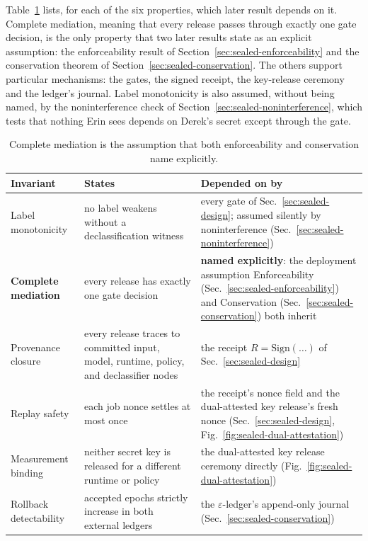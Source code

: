 \documentclass[11pt,a4paper]{article}
\theoremstyle{definition}
\begin{document}
Table~\ref{tab:sealed-side-invariants} lists, for each of the six
properties, which later result depends on it. Complete mediation, meaning that
every release passes through exactly one gate decision, is the only property
that two later results state as an explicit assumption: the enforceability
result of Section~\ref{sec:sealed-enforceability} and the conservation theorem
of Section~\ref{sec:sealed-conservation}. The others support particular
mechanisms: the gates, the signed receipt, the key-release ceremony and the
ledger's journal. Label monotonicity is also assumed, without being named, by
the noninterference check of Section~\ref{sec:sealed-noninterference}, which
tests that nothing Erin sees depends on Derek's secret except through the
gate.

\begin{table}[H]\centering\footnotesize
\caption{Complete mediation is the assumption that both enforceability and
conservation name explicitly.}
\label{tab:sealed-side-invariants}
\begin{tabularx}{\textwidth}{@{}>{\raggedright\arraybackslash}p{2.6cm} >{\raggedright\arraybackslash}X >{\raggedright\arraybackslash}p{3.6cm}@{}}
\toprule
Invariant & States & Depended on by \\
\midrule
Label monotonicity & no label weakens without a declassification witness & every gate of Sec.~\ref{sec:sealed-design}; assumed silently by noninterference (Sec.~\ref{sec:sealed-noninterference}) \\
\textbf{Complete mediation} & every release has exactly one gate decision & \textbf{named explicitly}: the deployment assumption Enforceability (Sec.~\ref{sec:sealed-enforceability}) and Conservation (Sec.~\ref{sec:sealed-conservation}) both inherit \\
Provenance closure & every release traces to committed input, model, runtime, policy, and declassifier nodes & the receipt $R=\mathrm{Sign}(\ldots)$ of Sec.~\ref{sec:sealed-design} \\
Replay safety & each job nonce settles at most once & the receipt's nonce field and the dual-attested key release's fresh nonce (Sec.~\ref{sec:sealed-design}, Fig.~\ref{fig:sealed-dual-attestation}) \\
Measurement binding & neither secret key is released for a different runtime or policy & the dual-attested key release ceremony directly (Fig.~\ref{fig:sealed-dual-attestation}) \\
Rollback detectability & accepted epochs strictly increase in both external ledgers & the $\varepsilon$-ledger's append-only journal (Sec.~\ref{sec:sealed-conservation}) \\
\bottomrule
\end{tabularx}
\end{table}
\end{document}
